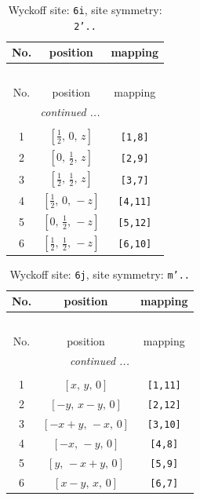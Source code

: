 \documentclass[fleqn,8pt]{jsarticle}
\begin{document}
\renewcommand{\arraystretch}{1.2}
\begin{longtable}{ccc}
\caption{Wyckoff site: {\tt 6i}, site symmetry: {\tt 2'..}}
 \\
 \hline \hline
No. & position & mapping \\ \hline \endfirsthead

\multicolumn{2}{l}{\tablename\ \thetable{}} \\
 \hline \hline
No. & position & mapping \\ \hline \endhead

 \hline \hline
\multicolumn{2}{r}{\footnotesize\it continued ...} \\ \endfoot

 \hline \hline
\multicolumn{2}{r}{} \\ \endlastfoot

1 & $\left[ \frac{1}{2},\, 0,\, z \right]$ & {\tt [1,8]} \\ \hline
2 & $\left[ 0,\, \frac{1}{2},\, z \right]$ & {\tt [2,9]} \\ \hline
3 & $\left[ \frac{1}{2},\, \frac{1}{2},\, z \right]$ & {\tt [3,7]} \\ \hline
4 & $\left[ \frac{1}{2},\, 0,\, - z \right]$ & {\tt [4,11]} \\ \hline
5 & $\left[ 0,\, \frac{1}{2},\, - z \right]$ & {\tt [5,12]} \\ \hline
6 & $\left[ \frac{1}{2},\, \frac{1}{2},\, - z \right]$ & {\tt [6,10]} \\
\end{longtable}
\renewcommand{\arraystretch}{1.2}
\begin{longtable}{ccc}
\caption{Wyckoff site: {\tt 6j}, site symmetry: {\tt m'..}}
 \\
 \hline \hline
No. & position & mapping \\ \hline \endfirsthead

\multicolumn{2}{l}{\tablename\ \thetable{}} \\
 \hline \hline
No. & position & mapping \\ \hline \endhead

 \hline \hline
\multicolumn{2}{r}{\footnotesize\it continued ...} \\ \endfoot

 \hline \hline
\multicolumn{2}{r}{} \\ \endlastfoot

1 & $\left[ x,\, y,\, 0 \right]$ & {\tt [1,11]} \\ \hline
2 & $\left[ - y,\, x - y,\, 0 \right]$ & {\tt [2,12]} \\ \hline
3 & $\left[ - x + y,\, - x,\, 0 \right]$ & {\tt [3,10]} \\ \hline
4 & $\left[ - x,\, - y,\, 0 \right]$ & {\tt [4,8]} \\ \hline
5 & $\left[ y,\, - x + y,\, 0 \right]$ & {\tt [5,9]} \\ \hline
6 & $\left[ x - y,\, x,\, 0 \right]$ & {\tt [6,7]} \\
\end{longtable}
\end{document}
